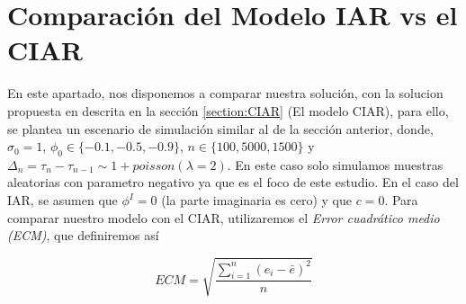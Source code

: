 \section{Comparación del Modelo IAR vs el CIAR}
En este apartado, nos disponemos a comparar nuestra solución, con la solucion propuesta en \cite{elorrieta2019discrete}
descrita en la sección \ref{section:CIAR} (El modelo CIAR), para ello, se plantea un escenario de simulación similar al de la sección anterior, donde,
$\sigma_0 = 1$, $\phi_0 \in \lbrace -0.1 , -0.5, -0.9\rbrace$, $n \in \lbrace100, 5000, 1500\rbrace$ y $\Delta_n = \tau_n - \tau_{n-1} \sim 1 + poisson(\lambda = 2)$. En este caso solo simulamos muestras aleatorias con parametro negativo ya que es el foco de este estudio. En el caso del IAR, se asumen que 
$\phi^{I} = 0$ (la parte imaginaria es cero) y que $c = 0$. Para comparar nuestro modelo con el CIAR, utilizaremos el \emph{Error cuadrático medio (ECM)}, que definiremos así

$$ECM = \sqrt{\frac{\sum_{i=1}^{n}(e_i - \bar{e})^2}{n}}$$

